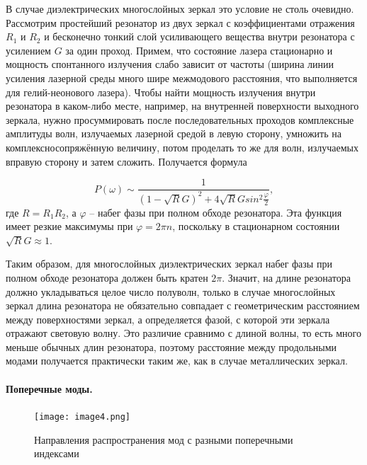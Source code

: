 \documentclass[a4paper,12pt]{article} %
\begin{document}
В случае диэлектрических многослойных зеркал это условие не столь очевидно. Рассмотрим простейший резонатор из двух зеркал с коэффициентами отражения $R_1$ и $R_2$ и бесконечно тонкий слой усиливающего вещества внутри резонатора с усилением $G$ за один проход. Примем, что состояние лазера стационарно и мощность спонтанного излучения слабо зависит от частоты (ширина линии усиления лазерной среды много шире межмодового расстояния, что выполняется для гелий-неонового лазера). Чтобы найти мощность излучения внутри резонатора в каком-либо месте, например, на внутренней поверхности выходного зеркала, нужно просуммировать после последовательных проходов комплексные амплитуды волн, излучаемых лазерной средой в левую сторону, умножить на комплексносопряжённую величину, потом проделать то же для волн, излучаемых вправую сторону и затем сложить. Получается формула

\[ P(\omega)\sim\frac{1}{(1-\sqrt{R}G)^2+4\sqrt{R}Gsin^2{\frac{\varphi}{2}}}, \]
где $R=R_1R_2$, а $\varphi$ -- набег фазы при полном обходе резонатора. Эта функция имеет резкие максимумы при $\varphi=2\pi n$, поскольку в стационарном состоянии $\sqrt{R}G\approx1$.

Таким образом, для многослойных диэлектрических зеркал  набег фазы при полном обходе резонатора должен быть кратен $2\pi$. Значит, на длине резонатора должно укладываться целое число полуволн, только в случае многослойных зеркал длина резонатора не обязательно совпадает с геометрическим расстоянием между поверхностями зеркал, а определяется фазой, с которой эти зеркала отражают световую волну. Это различие сравнимо с длиной волны, то есть много меньше обычных длин резонатора, поэтому расстояние между продольными модами получается практически таким же,
как в случае металлических зеркал.

\paragraph{Поперечные моды.} 

\begin{figure}
    \texttt{[image: image4.png]}
    \caption{Направления распространения мод с разными поперечными индексами}
    \label{img4}
\end{figure}
\end{document}
